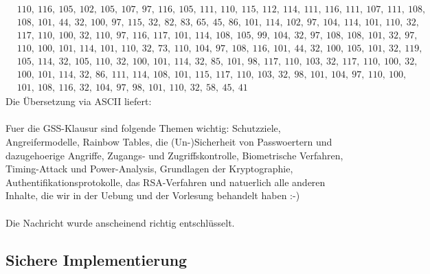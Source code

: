 \documentclass[ngerman]{fbi-aufgabenblatt}
\begin{document}
\begin{align*}
& 110,~ 116,~ 105,~ 102,~ 105,~ 107,~ 97 ,~116 ,~105 ,~111,~ 110,~ 115,~ 112,~ 114,~ 111,~ 116,~ 111,~ 107,~ 111,~ 108,~  \\&108,~ 101,~ 44,~ 32,~ 100,~ 97,~ 115,~ 32,~ 82,~ 83,~ 65,~ 45,~ 86,~ 101,~ 114,~ 102,~ 97,~ 104,~ 114,~ 101,~ 110,~ 32,~  \\&117,~ 110,~ 100,~ 32,~ 110,~ 97,~ 116,~ 117,~ 101,~ 114,~ 108,~ 105,~ 99,~ 104,~ 32,~ 97,~ 108,~ 108,~ 101,~ 32,~ 97,~ \\&110,~ 100,~ 101,~ 114,~ 101,~ 110,~ 32,~ 73,~ 110,~ 104,~ 97,~ 108,~ 116,~ 101,~ 44,~ 32,~ 100,~ 105,~ 101,~ 32,~ 119,~ \\&105,~ 114,~ 32,~ 105,~ 110,~ 32,~ 100,~ 101,~ 114,~ 32,~ 85,~ 101,~ 98,~ 117,~ 110,~ 103,~ 32,~ 117,~ 110,~ 100,~ 32 ,~ \\&100,~ 101,~ 114,~ 32,~ 86,~ 111,~ 114,~ 108,~ 101,~ 115,~ 117,~ 110,~ 103,~ 32,~ 98,~ 101,~ 104,~ 97 ,~ 110,~ 100,~  \\&101,~ 108,~ 116,~ 32,~ 104,~ 97,~ 98,~ 101,~ 110,~ 32,~ 58,~ 45,~ 41 
\end{align*}
Die Übersetzung via ASCII liefert: \\~\\
Fuer die GSS-Klausur sind folgende Themen wichtig: Schutzziele, Angreifermodelle, Rainbow Tables, die (Un-)Sicherheit von Passwoertern und dazugehoerige Angriffe, Zugangs- und Zugriffskontrolle, Biometrische Verfahren, Timing-Attack und Power-Analysis, Grundlagen der Kryptographie, Authentifikationsprotokolle, das RSA-Verfahren und natuerlich alle anderen Inhalte, die wir in der Uebung und der Vorlesung behandelt haben :-)  \\~\\
Die Nachricht wurde anscheinend richtig entschlüsselt.
\subsection{Sichere Implementierung}
\end{document}
